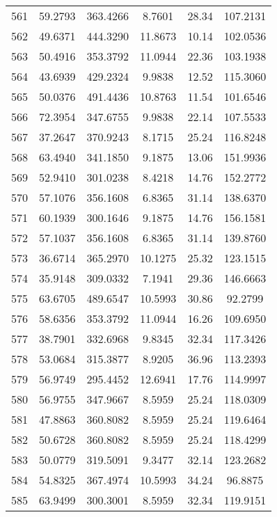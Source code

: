 \begin{center}
\begin{footnotesize}
\begin{tabular}{|c|ccccc|}
561 & 59.2793 & 363.4266 & 8.7601 & 28.34 & 107.2131 \\
562 & 49.6371 & 444.3290 & 11.8673 & 10.14 & 102.0536 \\
563 & 50.4916 & 353.3792 & 11.0944 & 22.36 & 103.1938 \\
564 & 43.6939 & 429.2324 & 9.9838 & 12.52 & 115.3060 \\
565 & 50.0376 & 491.4436 & 10.8763 & 11.54 & 101.6546 \\
566 & 72.3954 & 347.6755 & 9.9838 & 22.14 & 107.5533 \\
567 & 37.2647 & 370.9243 & 8.1715 & 25.24 & 116.8248 \\
568 & 63.4940 & 341.1850 & 9.1875 & 13.06 & 151.9936 \\
569 & 52.9410 & 301.0238 & 8.4218 & 14.76 & 152.2772 \\
570 & 57.1076 & 356.1608 & 6.8365 & 31.14 & 138.6370 \\
571 & 60.1939 & 300.1646 & 9.1875 & 14.76 & 156.1581 \\
572 & 57.1037 & 356.1608 & 6.8365 & 31.14 & 139.8760 \\
573 & 36.6714 & 365.2970 & 10.1275 & 25.32 & 123.1515 \\
574 & 35.9148 & 309.0332 & 7.1941 & 29.36 & 146.6663 \\
575 & 63.6705 & 489.6547 & 10.5993 & 30.86 & 92.2799 \\
576 & 58.6356 & 353.3792 & 11.0944 & 16.26 & 109.6950 \\
577 & 38.7901 & 332.6968 & 9.8345 & 32.34 & 117.3426 \\
578 & 53.0684 & 315.3877 & 8.9205 & 36.96 & 113.2393 \\
579 & 56.9749 & 295.4452 & 12.6941 & 17.76 & 114.9997 \\
580 & 56.9755 & 347.9667 & 8.5959 & 25.24 & 118.0309 \\
581 & 47.8863 & 360.8082 & 8.5959 & 25.24 & 119.6464 \\
582 & 50.6728 & 360.8082 & 8.5959 & 25.24 & 118.4299 \\
583 & 50.0779 & 319.5091 & 9.3477 & 32.14 & 123.2682 \\
584 & 54.8325 & 367.4974 & 10.5993 & 34.24 & 96.8875 \\
585 & 63.9499 & 300.3001 & 8.5959 & 32.34 & 119.9151 \\
\hline
\end{tabular}
\end{footnotesize}
\end{center}

